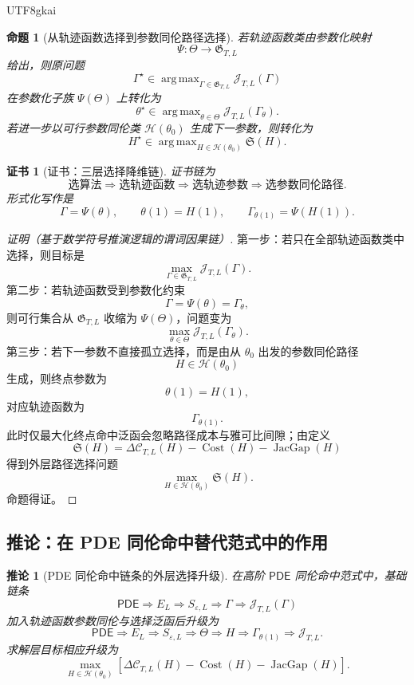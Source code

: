 \documentclass[12pt]{article}
\newtheorem{proposition}{命题}[section]
\newtheorem{corollary}{推论}[section]
\newtheorem{Certificate}{证书}[section]
\newcommand{\PDE}{\ensuremath{\mathsf{PDE}}}
\DeclareMathOperator{\Cost}{Cost}
\DeclareMathOperator{\JacGap}{JacGap}
\DeclareMathOperator*{\argmax}{arg\,max}
\begin{document}
\begin{CJK*}{UTF8}{gkai}
\begin{proposition}[从轨迹函数选择到参数同伦路径选择]
\label{prop:tex57-trajectory-to-homotopy-selection}
若轨迹函数类由参数化映射
\[
  \Psi:\Theta\to\mathfrak G_{T,L}
\]
给出，则原问题
\[
  \Gamma^\star
  \in
  \argmax_{\Gamma\in\mathfrak G_{T,L}}
  \mathcal J_{T,L}(\Gamma)
\]
在参数化子族 \(\Psi(\Theta)\) 上转化为
\[
  \theta^\star
  \in
  \argmax_{\theta\in\Theta}
  \mathcal J_{T,L}(\Gamma_\theta).
\]
若进一步以可行参数同伦类 \(\mathcal H(\theta_0)\) 生成下一参数，则转化为
\[
  H^\star
  \in
  \argmax_{H\in\mathcal H(\theta_0)}
  \mathfrak S(H).
\]
\end{proposition}

\begin{Certificate}[证书：三层选择降维链]
\label{cert:tex57-trajectory-to-homotopy-selection}
证书链为
\[
\boxed{
\text{选算法}
\Longrightarrow
\text{选轨迹函数}
\Longrightarrow
\text{选轨迹参数}
\Longrightarrow
\text{选参数同伦路径}.
}
\]
形式化写作是
\[
  \Gamma
  =
  \Psi(\theta),
  \qquad
  \theta(1)=H(1),
  \qquad
  \Gamma_{\theta(1)}
  =
  \Psi(H(1)).
\]
\end{Certificate}

\begin{proof}[证明（基于数学符号推演逻辑的谓词因果链）]
第一步：若只在全部轨迹函数类中选择，则目标是
\[
  \max_{\Gamma\in\mathfrak G_{T,L}}
  \mathcal J_{T,L}(\Gamma).
\]
第二步：若轨迹函数受到参数化约束
\[
  \Gamma=\Psi(\theta)=\Gamma_\theta,
\]
则可行集合从 \(\mathfrak G_{T,L}\) 收缩为 \(\Psi(\Theta)\)，问题变为
\[
  \max_{\theta\in\Theta}
  \mathcal J_{T,L}(\Gamma_\theta).
\]
第三步：若下一参数不直接孤立选择，而是由从 \(\theta_0\) 出发的参数同伦路径
\[
  H\in\mathcal H(\theta_0)
\]
生成，则终点参数为
\[
  \theta(1)=H(1),
\]
对应轨迹函数为
\[
  \Gamma_{\theta(1)}.
\]
此时仅最大化终点命中泛函会忽略路径成本与雅可比间隙；由定义
\[
  \mathfrak S(H)
  =
  \Delta\mathcal C_{T,L}(H)
  -
  \Cost(H)
  -
  \JacGap(H)
\]
得到外层路径选择问题
\[
  \max_{H\in\mathcal H(\theta_0)}
  \mathfrak S(H).
\]
命题得证。
\end{proof}

\subsection{推论：在 PDE 同伦命中替代范式中的作用}
\label{subsec:tex57-pde-corollary}

\begin{corollary}[PDE 同伦命中链条的外层选择升级]
\label{cor:tex57-pde-upgrade}
在高阶 \PDE{} 同伦命中范式中，基础链条
\[
  \PDE
  \Longrightarrow
  E_L
  \Longrightarrow
  S_{\varepsilon,L}
  \Longrightarrow
  \Gamma
  \Longrightarrow
  \mathcal J_{T,L}(\Gamma)
\]
加入轨迹函数参数同伦与选择泛函后升级为
\[
\boxed{
\PDE
\Longrightarrow
E_L
\Longrightarrow
S_{\varepsilon,L}
\Longrightarrow
\Theta
\Longrightarrow
H
\Longrightarrow
\Gamma_{\theta(1)}
\Longrightarrow
\mathcal J_{T,L}.
}
\]
求解层目标相应升级为
\[
\boxed{
\max_{H\in\mathcal H(\theta_0)}
\left[
\Delta\mathcal C_{T,L}(H)
-
\Cost(H)
-
\JacGap(H)
\right].
}
\]
\end{corollary}


\end{CJK*}
\end{document}
